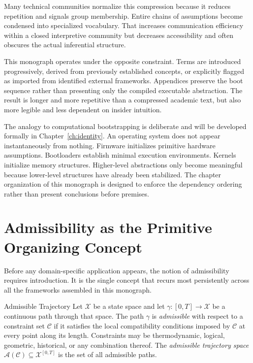 Many technical communities normalize this compression because it reduces repetition and
signals group membership. Entire chains of assumptions become condensed into specialized
vocabulary. That increases communication efficiency within a closed interpretive community
but decreases accessibility and often obscures the actual inferential structure.

This monograph operates under the opposite constraint. Terms are introduced progressively,
derived from previously established concepts, or explicitly flagged as imported from
identified external frameworks. Appendices preserve the boot sequence rather than
presenting only the compiled executable abstraction. The result is longer and more
repetitive than a compressed academic text, but also more legible and less dependent on
insider intuition.

\begin{remark}
The analogy to computational bootstrapping is deliberate and will be developed formally
in Chapter~\ref{ch:identity}. An operating system does not appear instantaneously from
nothing. Firmware initializes primitive hardware assumptions. Bootloaders establish
minimal execution environments. Kernels initialize memory structures. Higher-level
abstractions only become meaningful because lower-level structures have already been
stabilized. The chapter organization of this monograph is designed to enforce the
dependency ordering rather than present conclusions before premises.
\end{remark}

\section{Admissibility as the Primitive Organizing Concept}

Before any domain-specific application appears, the notion of admissibility requires
introduction. It is the single concept that recurs most persistently across all the
frameworks assembled in this monograph.

\begin{definition}{Admissible Trajectory}
Let $\mathcal{X}$ be a state space and let $\gamma: [0,T] \to \mathcal{X}$ be a
continuous path through that space. The path $\gamma$ is \emph{admissible} with
respect to a constraint set $\mathcal{C}$ if it satisfies the local compatibility
conditions imposed by $\mathcal{C}$ at every point along its length. Constraints
may be thermodynamic, logical, geometric, historical, or any combination thereof.
The \emph{admissible trajectory space} $\mathcal{A}(\mathcal{C}) \subseteq
\mathcal{X}^{[0,T]}$ is the set of all admissible paths.
\end{definition}

